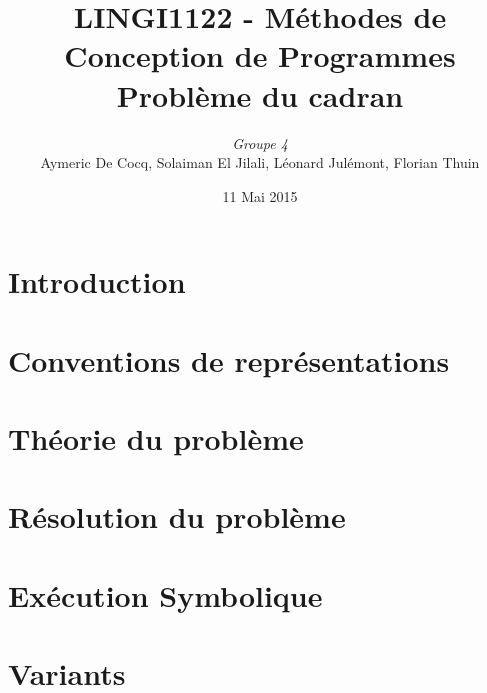 \documentclass[11pt,a4paper]{article}
\author{\textit{Groupe 4}\\
Aymeric De Cocq, Solaiman El Jilali, Léonard Julémont, Florian Thuin}
\title{LINGI1122 - Méthodes de Conception de Programmes\\
Problème du cadran}
\date{11 Mai 2015}
\begin{document}
\maketitle

\section* {Introduction}


\section{Conventions de représentations}

\section{Théorie du problème}




\section{Résolution du problème}





\section{Exécution Symbolique}

\section{Variants}
\end{document}
